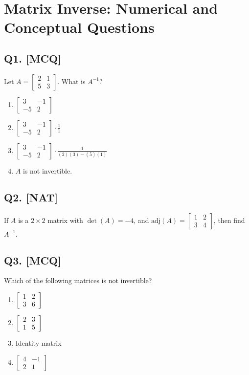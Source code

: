 \section{Matrix Inverse: Numerical and Conceptual Questions}

\subsection*{Q1. [MCQ]}
Let $A = \begin{bmatrix} 2 & 1 \\ 5 & 3 \end{bmatrix}$. What is $A^{-1}$?

\begin{enumerate}[label=(\alph*)]
    \item $\begin{bmatrix} 3 & -1 \\ -5 & 2 \end{bmatrix}$  
    \item $\begin{bmatrix} 3 & -1 \\ -5 & 2 \end{bmatrix} \cdot \frac{1}{1}$ 
    \item $\begin{bmatrix} 3 & -1 \\ -5 & 2 \end{bmatrix} \cdot \frac{1}{(2)(3)-(5)(1)}$
    \item $A$ is not invertible.
\end{enumerate}

\subsection*{Q2. [NAT]}
If $A$ is a $2 \times 2$ matrix with $\det(A) = -4$, and $\text{adj}(A) = \begin{bmatrix} 1 & 2 \\ 3 & 4 \end{bmatrix}$, then find $A^{-1}$.

\newpage
\subsection*{Q3. [MCQ]}
Which of the following matrices is not invertible?

\begin{enumerate}[label=(\alph*)]
    \item $\begin{bmatrix} 1 & 2 \\ 3 & 6 \end{bmatrix}$
    \item $\begin{bmatrix} 2 & 3 \\ 1 & 5 \end{bmatrix}$
    \item Identity matrix 
    \item $\begin{bmatrix} 4 & -1 \\ 2 & 1 \end{bmatrix}$
\end{enumerate}


